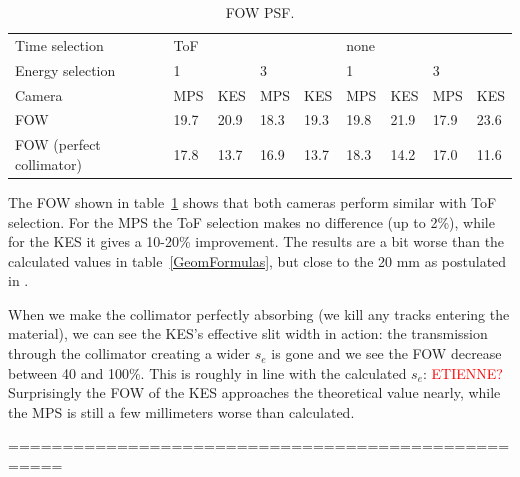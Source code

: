 \documentclass[a4paper,english]{article}
\begin{document}
\begin{table}
\centering
\begin{tabular}{lllllllll}
	\midrule
	Time selection 					& ToF &     &     &     & none&     &     &     \\
	Energy selection 				& 1   &     & 3   &     & 1   &     & 3   &     \\
	Camera 							& MPS & KES & MPS & KES & MPS & KES & MPS & KES \\
	\midrule
 	FOW                         	& 19.7& 20.9& 18.3& 19.3& 19.8& 21.9& 17.9& 23.6\\
 	FOW (perfect collimator) 	& 17.8& 13.7& 16.9& 13.7& 18.3& 14.2& 17.0& 11.6\\
	\midrule
\end{tabular}
\caption{FOW PSF.}
\label{FOWCOMP}
\end{table}

The FOW shown in table~\ref{FOWCOMP} shows that both cameras perform similar with ToF selection. For the MPS the ToF selection makes no difference (up to 2\%), while for the KES it gives a 10-20\% improvement. The results are a bit worse than the calculated values in table~\ref{GeomFormulas}, but close to the 20 mm as postulated in \cite{Priegnitz2015}.

When we make the collimator perfectly absorbing (we kill any tracks entering the material), we can see the KES's effective slit width in action: the transmission through the collimator creating a wider $s_e$ is gone and we see the FOW decrease between 40 and 100\%. This is roughly in line with the calculated $s_e$: \textcolor{red}{ETIENNE?} Surprisingly the FOW of the KES approaches the theoretical value nearly, while the MPS is still a few millimeters worse than calculated.





===================================================
\end{document}
